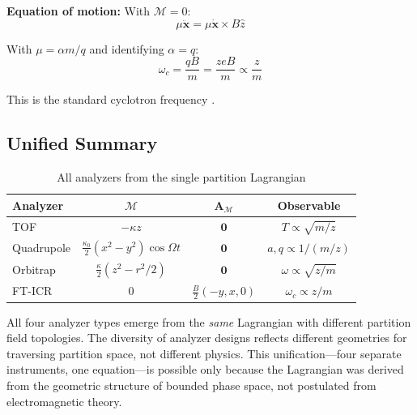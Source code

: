 \documentclass[twocolumn,10pt,a4paper]{article}
\theoremstyle{definition}
\theoremstyle{remark}
\newcommand{\Depth}{\mathcal{M}}
\newcommand{\Apartition}{\mathbf{A}_{\mathcal{M}}}
\newcommand{\partinert}{\mu}
\begin{document}
\textbf{Equation of motion:} With $\Depth = 0$:
\begin{equation}
    \partinert\ddot{\mathbf{x}} = \partinert\dot{\mathbf{x}} \times B\hat{z}
\end{equation}

With $\partinert = \alpha m/q$ and identifying $\alpha = q$:
\begin{equation}
    \boxed{\omega_c = \frac{qB}{m} = \frac{zeB}{m} \propto \frac{z}{m}}
\end{equation}

This is the standard cyclotron frequency \citep{marshall1998}.

\subsection{Unified Summary}

\begin{table}[H]
\centering
\caption{All analyzers from the single partition Lagrangian}
\label{tab:analyzers}
\small
\begin{tabular}{lccc}
\toprule
\textbf{Analyzer} & \textbf{$\Depth$} & \textbf{$\Apartition$} & \textbf{Observable} \\
\midrule
TOF & $-\kappa z$ & $\mathbf{0}$ & $T \propto \sqrt{m/z}$ \\
Quadrupole & $\frac{\kappa_0}{2}(x^2\!-\!y^2)\cos\Omega t$ & $\mathbf{0}$ & $a,q \propto 1/(m/z)$ \\
Orbitrap & $\frac{\kappa}{2}(z^2\!-\!r^2/2)$ & $\mathbf{0}$ & $\omega \propto \sqrt{z/m}$ \\
FT-ICR & $0$ & $\frac{B}{2}(-y,x,0)$ & $\omega_c \propto z/m$ \\
\bottomrule
\end{tabular}
\end{table}

All four analyzer types emerge from the \emph{same} Lagrangian with different partition field topologies. The diversity of analyzer designs reflects different geometries for traversing partition space, not different physics. This unification---four separate instruments, one equation---is possible only because the Lagrangian was derived from the geometric structure of bounded phase space, not postulated from electromagnetic theory.
\end{document}

